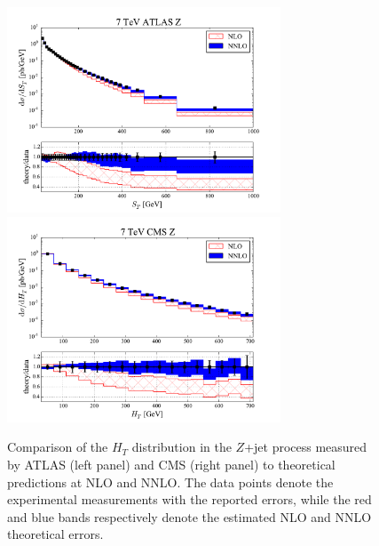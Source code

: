 \documentclass{article}
\begin{document}
\begin{figure}
\centering
\includegraphics[width=3.21in]{ATLAS-Z-7TeV_HT}
\includegraphics[width=3.21in]{CMS-Z-7TeV_HT}
\caption{Comparison of the $H_T$ distribution in the $Z$+jet process measured by ATLAS (left panel) and CMS (right panel) to theoretical predictions at NLO and NNLO.  The data points denote the experimental measurements with the reported errors, while the red and blue bands respectively denote the estimated NLO and NNLO theoretical errors.}
\label{fig:CMSZ}
\end{figure}
\end{document}
